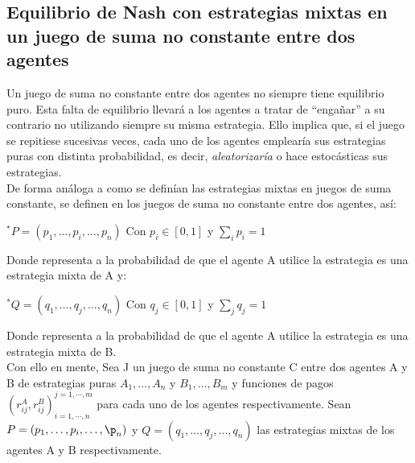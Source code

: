 \subsection{Equilibrio de Nash con estrategias mixtas en un juego de suma no constante entre dos agentes}
Un juego de suma no constante entre dos agentes no siempre tiene equilibrio puro. Esta falta de equilibrio llevará a los agentes a tratar de “engañar” a su contrario no utilizando siempre su misma estrategia. Ello implica que, si el juego se repitiese sucesivas veces, cada uno de los agentes emplearía sus estrategias puras con distinta probabilidad, es decir, \textit{aleatorizaría} o hace estocásticas sus estrategias.
\\
De forma análoga a como se definían las estrategias mixtas en juegos de suma constante, se definen en los juegos de suma no constante entre dos agentes,  así:\\
\begin{center}
    $ ^*P=(p_1,\ldots,p_i,\ldots,p_n)$ Con $p_i \in [0,1]$ y $\underset{i}{\sum}p_i=1$\\
\end{center}
Donde  representa a la probabilidad de que el agente A utilice la estrategia es una estrategia mixta de A y:\\
\begin{center}
    $ ^*Q=(q_1,\ldots,q_j,\ldots,q_n)$ Con $q_j \in [0,1]$ y $\underset{j}{\sum}q_j=1$\\
\end{center}
Donde  representa a la probabilidad de que el agente A utilice la estrategia es una estrategia mixta de B.
\\
Con ello en mente, Sea J un juego de suma no constante C entre dos agentes  A y B de estrategias puras $A_1,\ldots,A_n$ y $B_1,\ldots,B_m$ y funciones de pagos $\left( r_{ij}^A,r_{ij}^B \right)_{i=1, \cdots ,n}^{j=1, \cdots, m} $ para cada uno de los agentes respectivamente. Sean $P=(p_1,\ldots,p_i,\ldots,\p_n)$ y $Q = (q_1,\ldots,q_j,\ldots,q_n)$ las estrategias mixtas de los agentes A y B respectivamente.

